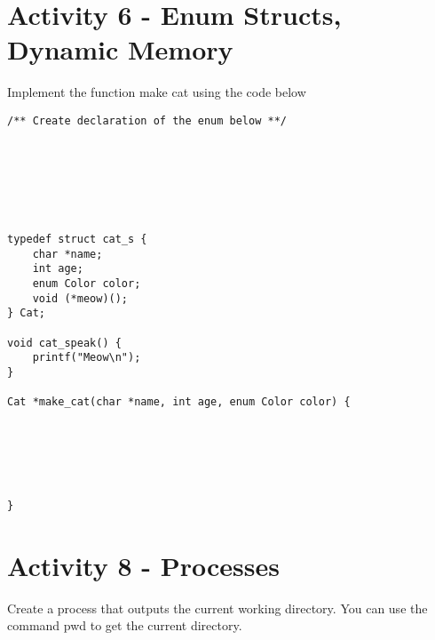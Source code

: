 \documentclass[]{article}
\begin{document}
\section*{Activity 6 - Enum Structs, Dynamic Memory}
Implement the function make cat using the code below

\begin{lstlisting}
/** Create declaration of the enum below **/







typedef struct cat_s {
    char *name;
    int age;
    enum Color color;
    void (*meow)();
} Cat;

void cat_speak() {
    printf("Meow\n");
}

Cat *make_cat(char *name, int age, enum Color color) {






}
\end{lstlisting}

\section*{Activity 8 - Processes}
Create a process that outputs the current working directory. You can use the command pwd to get
the current directory.
\end{document}
